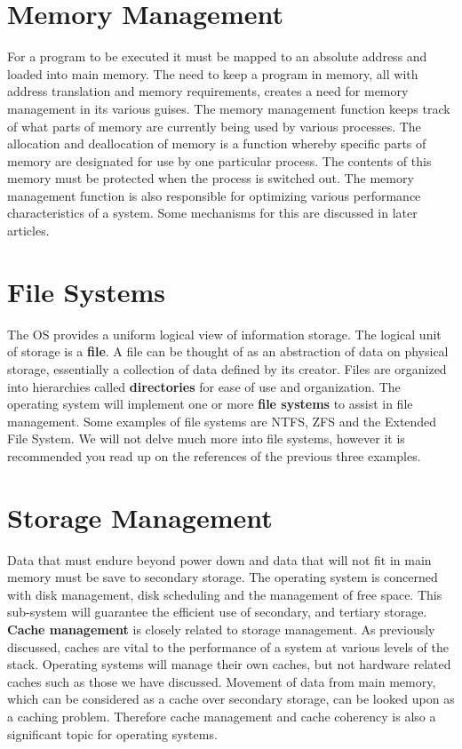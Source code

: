 \documentclass[10pt,a4paper]{article}
\begin{document}
\section{Memory Management}
For a program to be executed it must be mapped to an absolute address and loaded into main memory. The need to keep a program in memory, all with address translation and memory requirements, creates a need for memory management in its various guises. The memory management function keeps track of what parts of memory are currently being used by various processes. The allocation and deallocation of memory is a function whereby specific parts of memory are designated for use by one particular process. The contents of this memory must be protected when the process is switched out. The memory management function is also responsible for optimizing various performance characteristics of a system. Some mechanisms for this are discussed in later articles. 
\section{File Systems}
The OS provides a uniform logical view of information storage. The logical unit of storage is a {\bf file}. A file can be thought of as an abstraction of data on physical storage, essentially a collection of data defined by its creator. Files are organized into hierarchies called {\bf directories} for ease of use and organization. The operating system will implement one or more {\bf file systems} to assist in file management. Some examples of file systems are NTFS\cite{NTFS}, ZFS\cite{ZFS} and the Extended File System\cite{EXT}. We will not delve much more into file systems, however it is recommended you read up on the references of the previous three examples. 
\section{Storage Management}
Data that must endure beyond power down and data that will not fit in main memory must be save to secondary storage. The operating system is concerned with disk management, disk scheduling and the management of free space. This sub-system will guarantee the efficient use of secondary, and tertiary storage. {\bf Cache management} is closely related to storage management. As previously discussed, caches are vital to the performance of a system at various levels of the stack. Operating systems will manage their own caches, but not hardware related caches such as those we have discussed. Movement of data from main memory, which can be considered as a cache over secondary storage, can be looked upon as a caching problem. Therefore cache management and cache coherency is also a significant topic for operating systems. 
\end{document}
